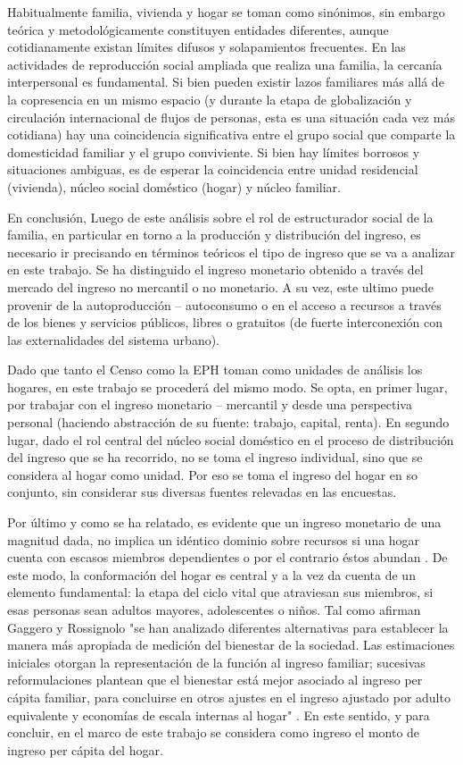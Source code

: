 	Habitualmente familia, vivienda y hogar se toman como sinónimos, sin embargo teórica y metodológicamente constituyen entidades diferentes, aunque cotidianamente existan límites difusos y solapamientos frecuentes. En las actividades de reproducción social ampliada que realiza una familia, la cercanía interpersonal es fundamental. Si bien pueden existir lazos familiares más allá de la copresencia en un mismo espacio (y durante la etapa de globalización y circulación internacional de flujos de personas, esta es una situación cada vez más cotidiana) hay una coincidencia significativa entre el grupo social que comparte la domesticidad familiar y el grupo conviviente. Si bien hay límites borrosos y situaciones ambiguas, es de esperar la coincidencia entre unidad residencial (vivienda), núcleo social doméstico (hogar) y núcleo familiar. 
	
	En conclusión, Luego de este análisis sobre el rol de estructurador social de la familia, en particular en torno a la producción y distribución del ingreso, es necesario ir precisando en términos teóricos el tipo de ingreso que se va a analizar en este trabajo. Se ha distinguido el ingreso monetario obtenido a través del mercado del ingreso no mercantil o no monetario. A su vez, este ultimo puede provenir de la autoproducción – autoconsumo o en el acceso a recursos a través de los bienes y servicios públicos, libres o gratuitos (de fuerte interconexión con las externalidades del sistema urbano).
	
	Dado que tanto el Censo como la EPH toman como unidades de análisis los hogares, en este trabajo se procederá del mismo modo. Se opta, en primer lugar, por trabajar con el ingreso monetario – mercantil y desde una perspectiva personal (haciendo abstracción de su fuente: trabajo, capital, renta). En segundo lugar, dado el rol central del núcleo social doméstico en el proceso de distribución del ingreso que se ha recorrido, no se toma el ingreso individual, sino que se considera al hogar como unidad. Por eso se toma el ingreso del hogar en so conjunto, sin considerar sus diversas fuentes relevadas en las encuestas.
	
	Por último y como se ha relatado, es evidente que un ingreso monetario de una magnitud dada, no implica un idéntico dominio sobre recursos si una hogar cuenta con escasos miembros dependientes o por el contrario éstos abundan \cite{buhmann}. De este modo, la conformación del hogar es central y a la vez da cuenta de un elemento fundamental: la etapa del ciclo vital que atraviesan sus miembros, si esas personas sean adultos mayores, adolescentes o niños. Tal como afirman Gaggero y Rossignolo "se han analizado diferentes alternativas para establecer la manera más apropiada de medición del bienestar de la sociedad. Las estimaciones iniciales otorgan la representación de la función al ingreso familiar; sucesivas reformulaciones plantean que el bienestar está mejor asociado al ingreso per cápita familiar, para concluirse en otros ajustes en el ingreso ajustado por adulto equivalente y economías de escala internas al hogar" \cite[p.~12]{gaggero} . En este sentido, y para concluir, en el marco de este trabajo se considera como ingreso el monto de ingreso per cápita del hogar.
	
